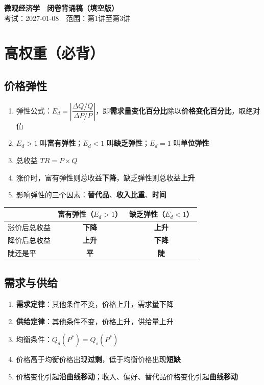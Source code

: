 \documentclass[a4paper,fontset=windows]{ctexart}
\newlength{\sbw}
\newcommand{\kw}[1]{\ifdefined\SBFILL\settowidth{\sbw}{#1}\underline{\hspace*{\dimexpr\sbw+0.6em\relax}}\else\textbf{#1}\fi}
\begin{document}
\begin{center}
{\LARGE\bfseries 微观经济学　闭卷背诵稿\ifdefined\SBFILL（填空版）\fi}\\[4pt]
{\small 考试：2027-01-08　范围：第1讲至第3讲}
\end{center}

\section{高权重（必背）}
\subsection{价格弹性}
\begin{enumerate}
\item 弹性公式：$E_d=\left|\dfrac{\Delta Q/Q}{\Delta P/P}\right|$，即\kw{需求量变化百分比}除以\kw{价格变化百分比}，取绝对值
\item $E_d>1$ 叫\kw{富有弹性}；$E_d<1$ 叫\kw{缺乏弹性}；$E_d=1$ 叫\kw{单位弹性}
\item 总收益 $TR=P\times Q$
\item 涨价时，富有弹性则总收益\kw{下降}，缺乏弹性则总收益\kw{上升}
\item 影响弹性的三个因素：\kw{替代品}、\kw{收入比重}、\kw{时间}
\end{enumerate}

\begin{center}
\begin{tabular}{@{}lcc@{}}
\toprule
 & 富有弹性（$E_d>1$） & 缺乏弹性（$E_d<1$） \\
\midrule
涨价后总收益 & \kw{下降} & \kw{上升} \\
降价后总收益 & \kw{上升} & \kw{下降} \\
陡还是平 & \kw{平} & \kw{陡} \\
\bottomrule
\end{tabular}
\end{center}

\subsection{需求与供给}
\begin{enumerate}
\item \kw{需求定律}：其他条件不变，价格上升，需求量下降
\item \kw{供给定律}：其他条件不变，价格上升，供给量上升
\item 均衡条件：$Q_d(P^*)=Q_s(P^*)$
\item 价格高于均衡价格出现\kw{过剩}，低于均衡价格出现\kw{短缺}
\item 价格变化引起\kw{沿曲线移动}；收入、偏好、替代品价格变化引起\kw{曲线移动}
\end{enumerate}
\end{document}
